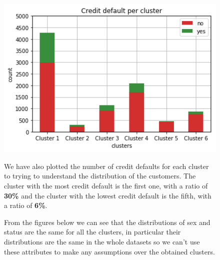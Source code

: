 \begin{figure}[h]
    \begin{minipage}[h]{.50\textwidth}
    \includegraphics[width=1\textwidth]{img/ch3/kmeans_default}

  \end{minipage}
  \begin{minipage}[h]{.50\textwidth}
    
    We have also plotted the number of credit defaults for each cluster to trying to understand the distribution of the customers. The cluster with the most credit default is the first one, with a ratio of \textbf{30\%} and the cluster with the lowest credit default is the fifth, with a ratio of \textbf{6\%}.

  From the figures below we can see that the distributions of sex and status are the same for all the clusters, in particular their distributions are the same in the whole datasets so we can't use these attributes to make any assumptions over the obtained clusters.
      \end{minipage}
\end{figure}

